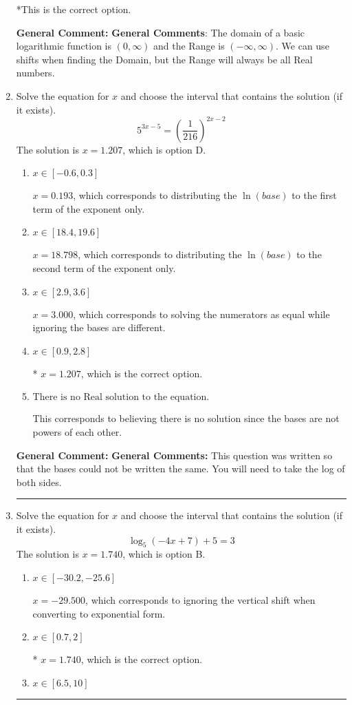\documentclass{extbook}[14pt]
\newcommand{\litem}[1]{\item #1

\rule{\textwidth}{0.4pt}}
\begin{document}
\begin{enumerate}
{\begin{enumerate}[label=\Alph*.]
*This is the correct option.
\end{enumerate}

\textbf{General Comment:} \textbf{General Comments}: The domain of a basic logarithmic function is $(0, \infty)$ and the Range is $(-\infty, \infty)$. We can use shifts when finding the Domain, but the Range will always be all Real numbers.
}
\litem{
Solve the equation for $x$ and choose the interval that contains the solution (if it exists).
\[ 5^{3x-5} = \left(\frac{1}{216}\right)^{2x-2} \]
The solution is \( x = 1.207 \), which is option D.\begin{enumerate}[label=\Alph*.]
\item \( x \in [-0.6, 0.3] \)

$x = 0.193$, which corresponds to distributing the $\ln(base)$ to the first term of the exponent only.
\item \( x \in [18.4, 19.6] \)

$x = 18.798$, which corresponds to distributing the $\ln(base)$ to the second term of the exponent only.
\item \( x \in [2.9, 3.6] \)

$x = 3.000$, which corresponds to solving the numerators as equal while ignoring the bases are different.
\item \( x \in [0.9, 2.8] \)

* $x = 1.207$, which is the correct option.
\item \( \text{There is no Real solution to the equation.} \)

This corresponds to believing there is no solution since the bases are not powers of each other.
\end{enumerate}

\textbf{General Comment:} \textbf{General Comments:} This question was written so that the bases could not be written the same. You will need to take the log of both sides.
}
\litem{
Solve the equation for $x$ and choose the interval that contains the solution (if it exists).
\[ \log_{5}{(-4x+7)}+5 = 3 \]
The solution is \( x = 1.740 \), which is option B.\begin{enumerate}[label=\Alph*.]
\item \( x \in [-30.2, -25.6] \)

$x = -29.500$, which corresponds to ignoring the vertical shift when converting to exponential form.
\item \( x \in [0.7, 2] \)

* $x = 1.740$, which is the correct option.
\item \( x \in [6.5, 10] \)


\end{enumerate}}
\end{enumerate}
\end{document}
